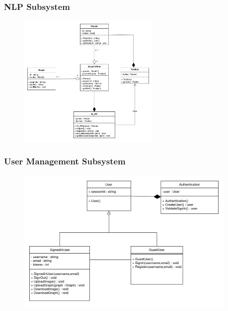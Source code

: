 \documentclass[11pt,a4paper]{article}
\begin{document}
\subsubsection*{NLP Subsystem}
\begin{figure}[htbp]
    \centering
    \includegraphics[width=0.61\textwidth]{../diagramPng/Graph Parsing-Subsystem.png}
\end{figure}

\pagebreak
{}
\subsubsection*{User Management Subsystem}
\begin{figure}[htbp]
    \centering
    \includegraphics[width=0.95\textwidth]{../diagramPng/User-Subsystem.png}
\end{figure}

\pagebreak

\end{document}
